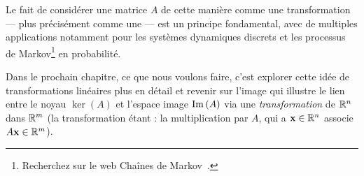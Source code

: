 Le fait de considérer une matrice $A$ de cette manière comme une transformation --- plus précisément comme une  --- est un principe fondamental, avec de multiples applications notamment pour les systèmes dynamiques discrets et les processus de Markov\footnote{Recherchez sur le web  \og Chaînes de Markov\ \fg.} en probabilité.


Dans le prochain chapitre, ce que nous voulons faire, c'est explorer cette idée de transformations linéaires plus en détail
et revenir sur l'image qui illustre le lien entre le noyau $\ker(A)$ et l'espace image $\operatorname{Im}\,(A)$ via une \emph{transformation} de
$\mathbb{R}^n$ dans $\mathbb{R}^m$ (la transformation étant : la multiplication par $A$, qui a $\mathbf{x}\in\mathbb{R}^n$ associe $A\mathbf{x}\in\mathbb{R}^m$).



